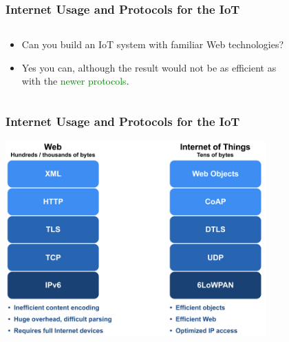\documentclass{beamer}
\begin{document}
\begin{frame}
	\frametitle{Internet Usage and Protocols for the IoT}
	\begin{columns}[c]
		\begin{column}{30cm}
			\vspace{.1cm}
			\begin{itemize}
				\justifying
				\item Can you build an IoT system with familiar Web technologies?
				\item Yes you can, although the result would not be as \textcolor{Ocean}{efficient} as\\
				with the \textcolor{green}{newer protocols}.
			\end{itemize}
		\end{column}
	\end{columns}
	\vspace{.5cm}
	\hspace*{5.5cm}
\end{frame}

\begin{frame}
	\frametitle{Internet Usage and Protocols for the IoT}
	\vspace{.5cm}
	\hspace*{1.5cm} \includegraphics[width=10cm]{figs/Web-and-IoT-Stacks.png}
\end{frame}
\end{document}
